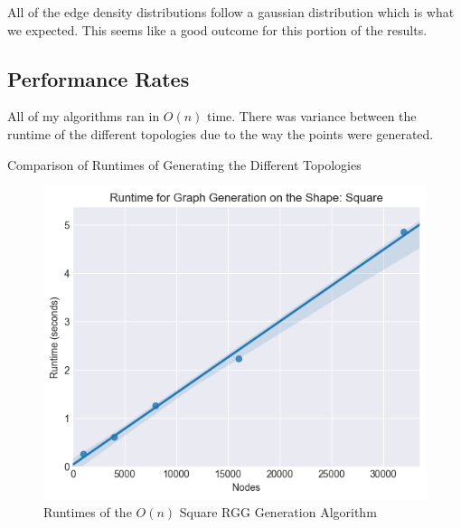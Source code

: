 \documentclass{article}
\begin{document}
  All of the edge density distributions follow a gaussian distribution which is what we expected.
  This seems like a good outcome for this portion of the results.
  \subsection{Performance Rates}
  All of my algorithms ran in $O(n)$ time.
  There was variance between the runtime of the different topologies due to the way the points were generated.
  \begin{center}
	  \begin{table}[H]
		  \caption{Comparison of Runtimes of Generating the Different Topologies}
	  \end{table}
  \end{center}

  \begin{figure}[H]

    \includegraphics[width=1 \textwidth]{square/runtime/runtime_chart}
    \caption{Runtimes of the $O(n)$ Square RGG Generation Algorithm}
  \end{figure}
\end{document}
